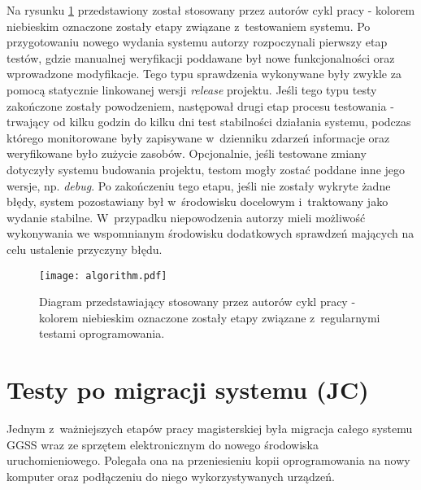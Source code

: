 \clearpage
Na rysunku \ref{fig:tests_1} przedstawiony został stosowany przez autorów cykl pracy - kolorem niebieskim oznaczone zostały etapy związane z~testowaniem systemu. Po przygotowaniu nowego wydania systemu autorzy rozpoczynali pierwszy etap testów, gdzie manualnej weryfikacji poddawane był nowe funkcjonalności oraz wprowadzone modyfikacje. Tego typu sprawdzenia wykonywane były zwykle za pomocą statycznie linkowanej wersji \emph{release} projektu. Jeśli tego typu testy zakończone zostały powodzeniem, następował drugi etap procesu testowania - trwający od kilku godzin do kilku dni test stabilności działania systemu, podczas którego monitorowane były zapisywane w~dzienniku zdarzeń informacje oraz weryfikowane było zużycie zasobów. Opcjonalnie, jeśli testowane zmiany dotyczyły systemu budowania projektu, testom mogły zostać poddane inne jego wersje, np. \emph{debug}. Po zakończeniu tego etapu, jeśli nie zostały wykryte żadne błędy, system pozostawiany był w~środowisku docelowym i~traktowany jako wydanie stabilne. W~przypadku niepowodzenia autorzy mieli możliwość wykonywania we wspomnianym środowisku dodatkowych sprawdzeń mających na celu ustalenie przyczyny błędu.

\begin{figure}[H]
\centering
\texttt{[image: algorithm.pdf]}
\caption{Diagram przedstawiający stosowany przez autorów cykl pracy - kolorem niebieskim oznaczone zostały etapy związane z~regularnymi testami oprogramowania.}
\label{fig:tests_1}
\end{figure}

\section{Testy po migracji systemu (JC)}

Jednym z~ważniejszych etapów pracy magisterskiej była migracja całego systemu GGSS wraz ze sprzętem elektronicznym do nowego środowiska uruchomieniowego. Polegała ona na przeniesieniu kopii oprogramowania na nowy komputer oraz podłączeniu do niego wykorzystywanych urządzeń.


